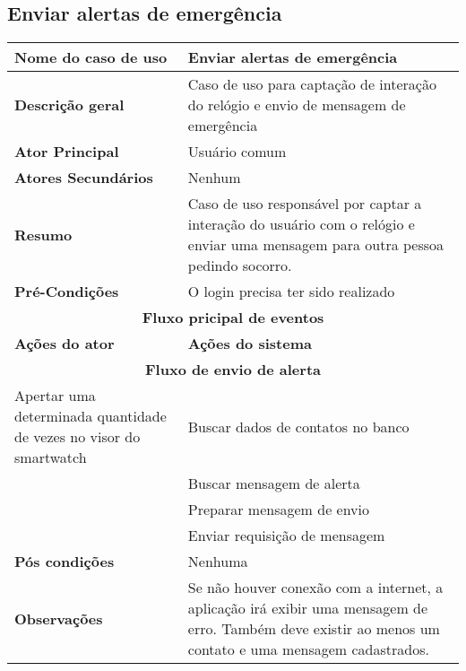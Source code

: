 \subsection{Enviar alertas de emergência}
\begin{center}
\begin{tabular}{ |p{7cm}|p{7cm}| } 
 \hline
 \textbf {Nome do caso de uso} & Enviar alertas de emergência\\
 \hline
 \textbf{Descrição geral} & Caso de uso para captação de interação do relógio e envio de mensagem de emergência \\
 \hline
 \textbf{Ator Principal} & Usuário comum \\ 
 \hline
 \textbf{Atores Secundários} & Nenhum \\
 \hline
 \textbf{Resumo} & Caso de uso responsável por captar a interação do usuário com o relógio e enviar uma mensagem para outra pessoa pedindo socorro. \\
 \hline
 \textbf{Pré-Condições} & O login precisa ter sido realizado \\
 \hline 
 \multicolumn{2}{|c|}{\textbf{Fluxo pricipal de eventos} } \\
 \hline
 \textbf{Ações do ator} & \textbf{Ações do sistema} \\
 \hline
 \multicolumn{2}{|c|}{\textbf{Fluxo de envio de alerta} } \\
 \hline 
 Apertar uma determinada quantidade de vezes no visor do smartwatch & Buscar dados de contatos no banco \\
 \hline
  & Buscar mensagem de alerta\\
 \hline
 & Preparar mensagem de envio\\
 \hline
 & Enviar requisição de mensagem \\
 \hline
 \textbf{Pós condições} & Nenhuma \\
 \hline
 \textbf{Observações} & Se não houver conexão com a internet, a aplicação irá exibir uma mensagem de erro. Também deve existir ao menos um contato e uma mensagem cadastrados.\\
 \hline
\end{tabular}
\end{center}
